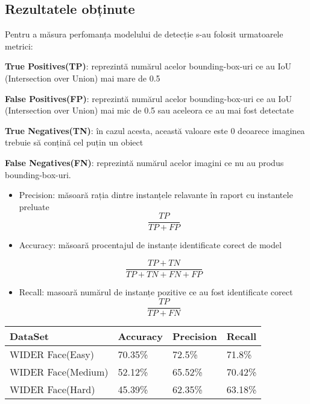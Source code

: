 \documentclass[a4paper, 12pt]{article}
\begin{document}
	
	
	\bigskip
	\bigskip
	\subsection{Rezultatele obținute}
	\bigskip
	
	\quad\space Pentru a măsura perfomanța modelului de detecție s-au folosit urmatoarele metrici: 
	
	\quad \textbf{True Positives(TP)}: reprezintă numărul acelor bounding-box-uri ce au IoU (Intersection over Union) mai mare de 0.5
	
	\quad \textbf{False Positives(FP)}: reprezintă numărul acelor bounding-box-uri ce au IoU (Intersection over Union) mai mic de 0.5 sau aceleora  ce au mai fost detectate
	
	\quad \textbf{True Negatives(TN)}: în cazul acesta, această valoare este 0 deoarece imaginea trebuie să conțină cel puțin un obiect
	
	\quad \textbf{False Negatives(FN)}: reprezintă numărul acelor imagini ce nu au produs bounding-box-uri.
	
	\bigskip
	\begin{itemize}
		
		\item Precision: măsoară rația dintre instanțele relavante în raport cu instantele preluate
		\[
		\frac{TP}{TP+FP}
		\]
		\item Accuracy: măsoară procentajul de instanțe identificate corect de model
		
		\[
		\frac{TP + TN}{TP + TN + FN + FP}
		\]
		
		\item Recall: masoară numărul de instanțe pozitive ce au fost identificate corect
		\[
		\frac{TP}{TP + FN}
		\]
	\end{itemize}
	
	\bigskip
	\begin{center}
		\begin{tabu} to 0.82\textwidth { | X[l] | X[c] | X[r] | X[cr] | }
			\hline
			DataSet            & Accuracy & Precision& Recall \\
			\hline
			WIDER Face(Easy)   & 70.35\%  & 72.5\%   & 71.8\% \\
			\hline
			WIDER Face(Medium) & 52.12\%  & 65.52\%  & 70.42\% \\
			\hline
			WIDER Face(Hard)   & 45.39\%  & 62.35\%  & 63.18\% \\
			\hline
		\end{tabu}
	\end{center}
	\bigskip
	
\end{document}
